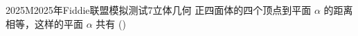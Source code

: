 
\begin{problem}{2025}{M}{2025年Fiddie联盟模拟测试}{7}{立体几何}
正四面体的四个顶点到平面 $\alpha$ 的距离相等，这样的平面 $\alpha$ 共有 (\hspace{1cm})
\begin{choices}
\end{choices}
\end{problem}

\begin{answer}

\end{answer}

\begin{solutions}

\end{solutions}